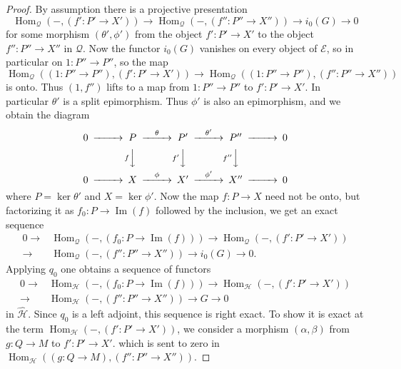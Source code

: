 \documentclass[11pt,a4paper]{amsart}
\theoremstyle{plain}
\theoremstyle{definition}
\begin{document}
\begin{proof}
By assumption there is a projective presentation
\[
\operatorname{Hom}_{\mathcal{Q}}(-,(f'\colon P'\to X')) \to
\operatorname{Hom}_{\mathcal{Q}}(-,(f''\colon P''\to X'')) \to
i_0(G) \to 0
\]
for some morphism $(\theta',\phi')$ from the object $f'\colon P'\to X'$ to the object $f''\colon P''\to X''$ in ${\mathcal{Q}}$.
Now the functor $i_0(G)$ vanishes on every object of ${\mathcal{E}}$, so in particular on $1\colon P''\to P''$,
so the map
\[
\operatorname{Hom}_{\mathcal{Q}}((1\colon P''\to P''),(f'\colon P'\to X')) \to
\operatorname{Hom}_{\mathcal{Q}}((1\colon P''\to P''),(f''\colon P''\to X'')) 
\]
is onto. Thus $(1,f'')$ lifts to a map from $1\colon P''\to P''$ to $f'\colon P'\to X'$.
In particular $\theta'$ is a split epimorphism. Thus $\phi'$ is also an epimorphism, and we 
obtain the diagram 
\[
\begin{CD}
0 @>>> P @>\theta >> P' @>\theta'>> P'' @>>> 0 \\
& & @Vf VV @Vf' VV @Vf'' VV \\
0 @>>> X @>\phi >> X' @>\phi' >> X'' @>>> 0 \\
\end{CD}
\]
where $P = \operatorname{ker} \theta'$ and $X = \operatorname{ker} \phi'$.
Now the map $f\colon P\to X$ need not be onto, but factorizing it as $f_0\colon P\to \operatorname{Im}(f)$
followed by the inclusion, we get an
exact sequence
\[
\begin{split}
0 \to
&\operatorname{Hom}_{\mathcal{Q}}(-,(f_0\colon P\to \operatorname{Im}(f))) \to
\operatorname{Hom}_{\mathcal{Q}}(-,(f'\colon P'\to X')) 
\\
\to
&\operatorname{Hom}_{\mathcal{Q}}(-,(f''\colon P''\to X'')) \to
i_0(G) \to 0.
\end{split}
\]
Applying $q_0$ one obtains a sequence of functors
\[
\begin{split}
0 \to
&\operatorname{Hom}_{\mathcal{H}}(-,(f_0\colon P\to \operatorname{Im}(f))) \to
\operatorname{Hom}_{\mathcal{H}}(-,(f'\colon P'\to X')) 
\\
\to
&\operatorname{Hom}_{\mathcal{H}}(-,(f''\colon P''\to X'')) \to
G \to 0
\end{split}
\]
in ${\widehat{\mathcal{H}}  }$. 
Since $q_0$ is a left adjoint, this sequence is
right exact.
To show it is exact at 
the term $\operatorname{Hom}_{\mathcal{H}}(-,(f'\colon P'\to X'))$,
we consider a morphism $(\alpha,\beta)$
from $g\colon Q\to M$ to $f'\colon P'\to X'$.
which is sent to zero in
$\operatorname{Hom}_{\mathcal{H}}((g\colon Q\to M),(f''\colon P''\to X''))$.

\end{proof}
\end{document}
